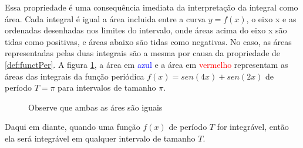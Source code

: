 Essa propriedade é uma consequência imediata da interpretação da integral como
área. Cada integral é igual a área incluida entre a curva $y=f(x)$, o eixo x e
as ordenadas desenhadas nos limites do intervalo, onde áreas acima do eixo x
são tidas como positivas, e áreas abaixo são tidas como negativas. No caso,
as áreas representadas pelas duas integrais são a mesma por causa da propriedade 
de \ref{def:functPer}. A figura \ref{fig:int_area}, a área em \textcolor{blue}{azul} e a
área em \textcolor{red}{vermelho} representam as áreas das integrais da função
periódica $f(x)=sen(4x)+sen(2x)$ de período $T=\pi$ para intervalos de tamanho $\pi$. 
\\
\begin{figure}[H]
\caption{Observe que ambas as áres são iguais}
\label{fig:int_area}
\end{figure}

Daqui em diante, quando uma função $f(x)$ de período $T$ for integrável, então
ela será integrável em qualquer intervalo de tamanho $T$.